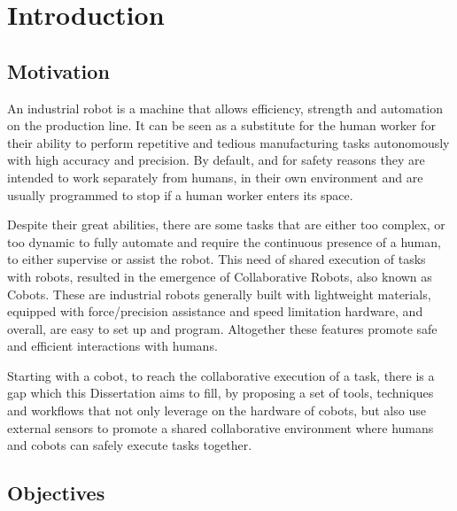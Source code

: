 \chapter{Introduction}
\label{chapter:introduction}





\section{Motivation}

\par An industrial robot is a machine that allows efficiency, strength and automation on the production line. It can be seen as a substitute for the human worker for their ability to perform repetitive and tedious manufacturing tasks autonomously with high accuracy and precision. By default, and for safety reasons they are intended to work separately from humans, in their own environment and are usually programmed to stop if a human worker enters its space.

\par Despite their great abilities, there are some tasks that are either too complex, or too dynamic to fully automate and require the continuous presence of a human, to either supervise or assist the robot. This need of shared execution of tasks with robots, resulted in the emergence of Collaborative Robots, also known as Cobots. These are industrial robots generally built with lightweight materials, equipped with force/precision assistance and speed limitation hardware, and overall, are easy to set up and program. Altogether these features promote safe and efficient interactions with humans.

\par Starting with a cobot, to reach the collaborative execution of a task, there is a gap which this Dissertation aims to fill, by proposing a set of tools, techniques and workflows that not only leverage on the hardware of cobots, but also use external sensors to promote a shared collaborative environment where humans and cobots can safely execute tasks together.



\section{Objectives}

